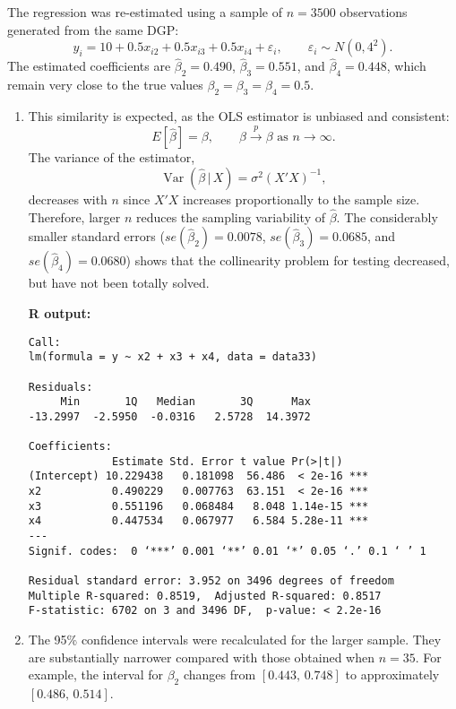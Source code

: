 
The regression was re-estimated using a sample of $n = 3500$ observations generated from the same DGP:
\[
y_i = 10 + 0.5x_{i2} + 0.5x_{i3} + 0.5x_{i4} + \varepsilon_i, 
\qquad \varepsilon_i \sim N(0,4^2).
\]
The estimated coefficients are $\hat{\beta}_2 = 0.490$, $\hat{\beta}_3 = 0.551$, and $\hat{\beta}_4 = 0.448$, 
which remain very close to the true values $\beta_2 = \beta_3 = \beta_4 = 0.5$.

\begin{enumerate}[label=(\roman*)]
\item 
This similarity is expected, as the OLS estimator is unbiased and consistent:
\[
E[\hat{\beta}] = \beta, \qquad 
\hat{\beta} \xrightarrow{p} \beta \text{ as } n \to \infty.
\]
The variance of the estimator,
\[
\operatorname{Var}(\hat{\beta}\,|\,X) = \sigma^2 (X'X)^{-1},
\]
decreases with $n$ since $X'X$ increases proportionally to the sample size.  Therefore, larger $n$ reduces the sampling variability of $\hat{\beta}$.  The considerably smaller standard errors  
($se(\hat{\beta}_2) = 0.0078$, $se(\hat{\beta}_3) = 0.0685$, and $se(\hat{\beta}_4) = 0.0680$) shows that the collinearity problem for testing decreased, but have not been totally solved. 

\medskip
\textbf{R output:}
\begin{verbatim}
Call:
lm(formula = y ~ x2 + x3 + x4, data = data33)

Residuals:
     Min       1Q   Median       3Q      Max 
-13.2997  -2.5950  -0.0316   2.5728  14.3972 

Coefficients:
             Estimate Std. Error t value Pr(>|t|)    
(Intercept) 10.229438   0.181098  56.486  < 2e-16 ***
x2           0.490229   0.007763  63.151  < 2e-16 ***
x3           0.551196   0.068484   8.048 1.14e-15 ***
x4           0.447534   0.067977   6.584 5.28e-11 ***
---
Signif. codes:  0 ‘***’ 0.001 ‘**’ 0.01 ‘*’ 0.05 ‘.’ 0.1 ‘ ’ 1

Residual standard error: 3.952 on 3496 degrees of freedom
Multiple R-squared: 0.8519,  Adjusted R-squared: 0.8517 
F-statistic: 6702 on 3 and 3496 DF,  p-value: < 2.2e-16
\end{verbatim}

\item

The 95\% confidence intervals were recalculated for the larger sample.  
They are substantially narrower compared with those obtained when $n = 35$.  
For example, the interval for $\beta_2$ changes from $[0.443,\, 0.748]$ to approximately $[0.486,\, 0.514]$.  


\end{enumerate}
